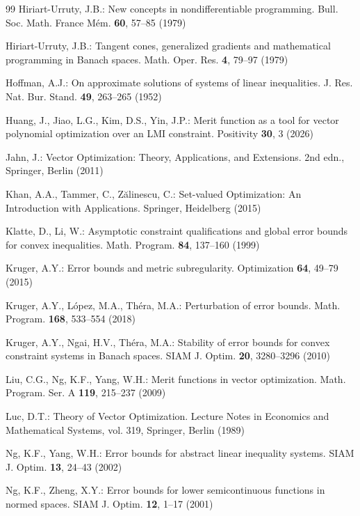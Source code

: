 \documentclass[11pt]{article}
\begin{document}
\begin{thebibliography}{99}
 	 Hiriart-Urruty, J.B.: New concepts in nondifferentiable programming. Bull. Soc. Math. France Mém. \textbf{60}, 57–85 (1979)
 	
 	 Hiriart-Urruty, J.B.: Tangent cones, generalized gradients and mathematical programming in Banach spaces. Math. Oper. Res. \textbf{4}, 79–97 (1979)
 	
 	 Hoffman, A.J.: On approximate solutions of systems of linear inequalities. J. Res. Nat. Bur. Stand. \textbf{49}, 263–265 (1952)
 	
 	 Huang, J., Jiao, L.G., Kim, D.S., Yin, J.P.: Merit function as a tool for vector polynomial optimization over an LMI constraint. Positivity \textbf{30}, 3 (2026)
 	
 	 Jahn, J.: Vector Optimization: Theory, Applications, and Extensions. 2nd edn., Springer, Berlin (2011)
 	
 	 Khan, A.A., Tammer, C., Zălinescu, C.: Set-valued Optimization: An Introduction with Applications. Springer, Heidelberg (2015)
 	
 	 Klatte, D., Li, W.: Asymptotic constraint qualifications and global error bounds for convex inequalities. Math. Program. \textbf{84}, 137–160 (1999)
 	
 	 Kruger, A.Y.: Error bounds and metric subregularity. Optimization \textbf{64}, 49–79 (2015)
 	
 	 Kruger, A.Y., López, M.A., Théra, M.A.: Perturbation of error bounds. Math. Program. \textbf{168}, 533–554 (2018)
 	
 	 Kruger, A.Y., Ngai, H.V., Théra, M.A.: Stability of error bounds for convex constraint systems in Banach spaces. SIAM J. Optim. \textbf{20}, 3280–3296 (2010)
 	
 	 Liu, C.G., Ng, K.F., Yang, W.H.: Merit functions in vector optimization. Math. Program. Ser. A \textbf{119}, 215–237 (2009)
 	
 	 Luc, D.T.: Theory of Vector Optimization. Lecture Notes in Economics and Mathematical Systems, vol. 319, Springer, Berlin (1989)
 	
 	 Ng, K.F., Yang, W.H.: Error bounds for abstract linear inequality systems. SIAM J. Optim. \textbf{13}, 24–43 (2002)
 	
 	 Ng, K.F., Zheng, X.Y.: Error bounds for lower semicontinuous functions in normed spaces. SIAM J. Optim. \textbf{12}, 1–17 (2001)
 	

\end{thebibliography}
\end{document}
